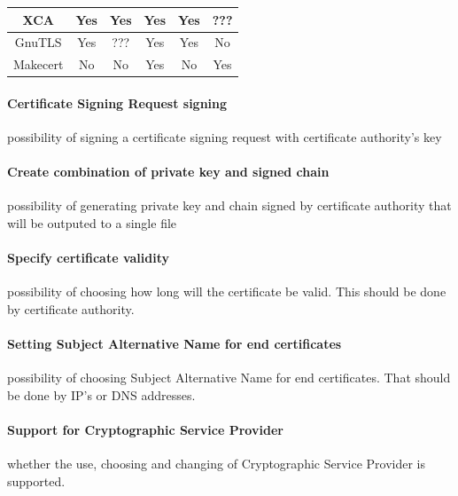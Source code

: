 \documentclass[10pt, a4paper]{report}
\begin{document}
\begin{table}[h!]
\begin{adjustbox}{max width=\textwidth}
\begin{tabular}{|c|c|c|c|c|c|}
XCA                    & \cellcolor[HTML]{34FF34}Yes   & \cellcolor[HTML]{34FF34}Yes              & \cellcolor[HTML]{34FF34}Yes                    & \cellcolor[HTML]{34FF34}Yes                & ???                                                                         \\ \hline
GnuTLS                 & \cellcolor[HTML]{34FF34}Yes   & ???	                                  & \cellcolor[HTML]{34FF34}Yes                    & \cellcolor[HTML]{34FF34}Yes                & \cellcolor[HTML]{FE0000}No                                                  \\ \hline
Makecert	       & \cellcolor[HTML]{FE0000}No    &   \cellcolor[HTML]{FE0000}No	 	  & \cellcolor[HTML]{34FF34}Yes			   & \cellcolor[HTML]{FE0000}No			& \cellcolor[HTML]{34FF34}Yes						      \\ \hline
\end{tabular}
\end{adjustbox}
\end{table}

\paragraph{Certificate Signing Request signing}
possibility of signing a certificate signing request with certificate authority's key

\paragraph{Create combination of private key and signed chain}
possibility of generating private key and chain signed by certificate authority that will be outputed to a single file

\paragraph{Specify certificate validity}
possibility of choosing how long will the certificate be valid. This should be done by certificate authority.

\paragraph{Setting Subject Alternative Name for end certificates}
possibility of choosing Subject Alternative Name for end certificates. That should be done by IP's or DNS addresses.

\paragraph{Support for Cryptographic Service Provider}
whether the use, choosing and changing of Cryptographic Service Provider is supported.
\end{document}
